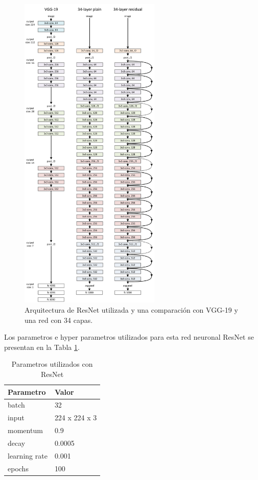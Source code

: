 \documentclass{article}
\begin{document}
\begin{figure}[H]
	\centering
	\includegraphics[width=0.6\textwidth]{img/resnet2}		
	\caption{Arquitectura de ResNet utilizada y una comparación con VGG-19 y una red con 34 capas.}
	\label{fig:resnet2}
\end{figure} 

	Los parametros e hyper parametros utilizados para esta red neuronal ResNet se presentan en la Tabla \ref{tab:resnet}.
	
	\begin{table}[h]
		\centering		
		\caption{Parametros utilizados con ResNet}
		\label{tab:resnet}
		\begin{tabular}{ p{3cm} p{3cm}}
			\hline 
			\textbf{Parametro} & \textbf{Valor}   \\
			\hline 
			batch & 32 \\
			input & 224 x 224 x 3 \\
			momentum & 0.9 \\
			decay & 0.0005 \\
			learning rate & 0.001 \\
			epochs & 100 \\
			\hline 
		\end{tabular}
	\end{table}
\end{document}
